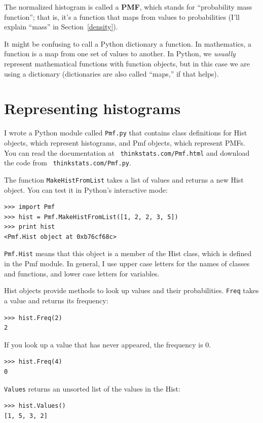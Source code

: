 \documentclass[12pt]{book}
\begin{document}
The normalized histogram is called a {\bf PMF}, which stands for
``probability mass function''; that is, it's a function that maps from
values to probabilities (I'll explain ``mass'' in
Section~\ref{density}).

It might be confusing to call a Python dictionary a function.  In
mathematics, a function is a map from one set of values to
another.  In Python, we {\em usually} represent mathematical functions
with function objects, but in this case we are using a dictionary
(dictionaries are also called ``maps,'' if that helps).


\section{Representing histograms}

I wrote a Python module called {\tt Pmf.py} that contains class
definitions for Hist objects, which represent histograms, and Pmf
objects, which represent PMFs.  You can read the documentation at {\tt
  thinkstats.com/Pmf.html} and download the code from {\tt
  thinkstats.com/Pmf.py}.

The function {\tt MakeHistFromList} takes a list of values and
returns a new Hist object.  You can test it in Python's interactive
mode:
%
\begin{verbatim}
>>> import Pmf
>>> hist = Pmf.MakeHistFromList([1, 2, 2, 3, 5])
>>> print hist
<Pmf.Hist object at 0xb76cf68c>
\end{verbatim}

{\tt Pmf.Hist} means that this object is a member of the Hist class,
which is defined in the Pmf module.  In general, I use upper case
letters for the names of classes and functions, and lower case letters
for variables.

Hist objects provide methods to look up values and their
probabilities.  {\tt Freq} takes a value and returns its frequency:
%
\begin{verbatim}
>>> hist.Freq(2)
2
\end{verbatim}

If you look up a value that has never appeared, the frequency is 0.
%
\begin{verbatim}
>>> hist.Freq(4)
0
\end{verbatim}

{\tt Values} returns an unsorted list of the values in the Hist:
%
\begin{verbatim}
>>> hist.Values()
[1, 5, 3, 2]
\end{verbatim}
\end{document}
